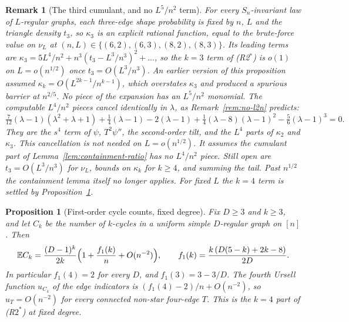\documentclass[11pt]{article}
\newtheorem{proposition}[theorem]{Proposition}
\newtheorem{remark}[theorem]{Remark}
\newcommand{\EE}{\mathbb{E}}
\begin{document}
\begin{remark}[The third cumulant, and no \(L^5/n^2\) term]
\label{rem:peel-kappa3}
For every \(S_n\)-invariant law of \(L\)-regular graphs, each three-edge shape
probability is fixed by \(n\), \(L\) and the triangle density \(t_3\), so
\(\kappa_3\) is an explicit rational function, equal to the brute-force value on
\(\nu_L\) at \((n,L)\in\{(6,2),(6,3),(8,2),(8,3)\}\). Its leading terms are
\(\kappa_3=5L^4/n^2+n^3(t_3-L^3/n^3)^2+\dots\), so the \(k=3\) term of (R2\(^*\)) is
\(o(1)\) on \(L=o(n^{1/2})\) once \(t_3=O(L^3/n^3)\). An earlier version of this
proposition assumed \(\kappa_k=O(L^{2k-1}/n^{k-1})\), which overstates \(\kappa_3\)
and produced a spurious barrier at \(n^{2/5}\). No piece of the expansion has an
\(L^5/n^2\) monomial. The computable \(L^4/n^2\) pieces cancel identically in
\(\lambda\), as Remark~\ref{rem:no-l2n} predicts:
\[
\tfrac7{12}(\lambda-1)(\lambda^2+\lambda+1)+\tfrac14(\lambda-1)-2(\lambda-1)
+\tfrac14(\lambda-8)(\lambda-1)^2-\tfrac56(\lambda-1)^3=0 .
\]
They are the \(s^4\) term of \(\psi\), \(T^2\psi''\), the second-order tilt, and
the \(L^4\) parts of \(\kappa_2\) and \(\kappa_3\).
This cancellation is not needed on \(L=o(n^{1/2})\). It assumes the cumulant part
of Lemma~\ref{lem:containment-ratio} has no \(L^4/n^2\) piece. Still open are
\(t_3=O(L^3/n^3)\) for \(\nu_L\), bounds on \(\kappa_k\) for \(k\ge4\), and summing
the tail. Past \(n^{1/2}\) the containment lemma itself no longer applies.
For fixed \(L\) the \(k=4\) term is settled by
Proposition~\ref{prop:cycle-first-order}.
\end{remark}

\begin{proposition}[First-order cycle counts, fixed degree]
\label{prop:cycle-first-order}
Fix \(D\ge3\) and \(k\ge3\), and let \(C_k\) be the number of \(k\)-cycles in a
uniform simple \(D\)-regular graph on \([n]\). Then
\[
\EE C_k=\frac{(D-1)^k}{2k}\Bigl(1+\frac{f_1(k)}n+O(n^{-2})\Bigr),\qquad
f_1(k)=\frac{k\,(D(5-k)+2k-8)}{2D}.
\]
In particular \(f_1(4)=2\) for every \(D\), and \(f_1(3)=3-3/D\). The fourth
Ursell function \(u_{C_4}\) of the edge indicators is \((f_1(4)-2)/n+O(n^{-2})\), so
\(u_T=O(n^{-2})\) for every connected non-star four-edge \(T\). This is the
\(k=4\) part of (R\(2^*\)) at fixed degree.
\end{proposition}
\end{document}
